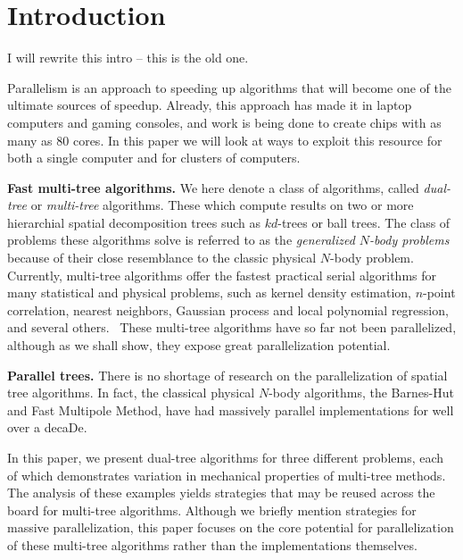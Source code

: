 \documentclass[times, 10pt,twocolumn]{article}
\begin{document}
\section{Introduction}

I will rewrite this intro -- this is the old one.

Parallelism is an approach to speeding up algorithms that will become one of the ultimate sources of speedup.
Already, this approach has made it in laptop computers and gaming consoles, and work is being done to create chips with as many as 80 cores.
In this paper we will look at ways to exploit this resource for both a single computer and for clusters of computers.

{\bf Fast multi-tree algorithms.}
We here denote a class of algorithms, called \emph{dual-tree} or \emph{multi-tree} algorithms.
These which compute results on two or more hierarchial spatial decomposition trees such as $kd$-trees or ball trees.
The class of problems these algorithms solve is referred to as the \emph{generalized $N$-body problems} because of their close resemblance to the classic physical $N$-body problem\cite{gray_nbody}.
Currently, multi-tree algorithms offer the fastest practical serial algorithms for many statistical and physical problems, such as kernel density estimation, $n$-point correlation, nearest neighbors, Gaussian process and local polynomial regression, and several others.\
These multi-tree algorithms have so far not been parallelized, although as we shall show, they expose great parallelization potential.

{\bf Parallel trees.} There is no shortage of research on the parallelization of spatial tree
algorithms.
In fact, the classical physical $N$-body algorithms, the Barnes-Hut\cite{barnes_hut} and Fast Multipole Method\cite{greengard_fmm}, have had massively parallel implementations for well over a decaDe\cite{singh_loadbal, grama_para_bh, amor_para_bh}.

In this paper, we present dual-tree algorithms for three different problems, each of which demonstrates variation in mechanical properties of multi-tree methods.
The analysis of these examples yields strategies that may be reused across the board for multi-tree algorithms.
Although we briefly mention strategies for massive parallelization, this paper focuses on the core potential for parallelization of these multi-tree algorithms rather than the implementations themselves.

%
%
%
%
%
%
%
%
%
%
\end{document}
